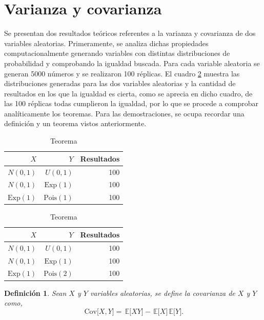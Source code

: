 \documentclass[12pt,letterpaper]{article}
\newcommand\cov[1]{\, \mathrm{Cov} \lbrack #1 \rbrack}
\newcommand\esp[1]{\, \mathbb{E} \lbrack #1 \rbrack}
\newtheorem{defi}{Definición}
\begin{document}
\section{Varianza y covarianza}
Se presentan dos resultados teóricos referentes a la varianza y covarianza de dos variables aleatorias. Primeramente, se analiza dichas propiedades computacionalmente generando variables con distintas distribuciones de probabilidad y comprobando la igualdad buscada. Para cada variable aleatoria se generan 5000 números y se realizaron 100 réplicas. El cuadro \ref{teos} muestra las distribuciones generadas para las dos variables aleatorias y la cantidad de resultados en los que la igualdad es cierta, como se aprecia en dicho cuadro, de las 100 réplicas todas cumplieron la igualdad, por lo que se procede a comprobar analíticamente los teoremas. Para las demostraciones, se ocupa recordar una definición y un teorema \cite{snell} vistos anteriormente.
\begin{table}
\caption{Resultados de las pruebas computacionales.}
\begin{subtable}{0.3\textwidth}
	\centering
	\caption{Teorema 2}
	\begin{tabular}{rrr}
  \hline
$X$ &  $Y$ & Resultados\\ 
  \hline
$N(0,1)$ & $U(0,1)$ & 100 \\
$N(0,1)$ & $\text{Exp}(1)$ & 100 \\
$\text{Exp}(1)$ & $\text{Pois}(1)$ & 100 \\ 
\hline
\end{tabular}
	\label{teo1}
\end{subtable}
\hfill
\begin{subtable}{0.3\textwidth}
	\centering
	\caption{Teorema }
	\begin{tabular}{rrr}
  \hline
$X$ &  $Y$ & Resultados\\ 
  \hline
$N(0,1)$ & $U(0,1)$ & 100 \\
$N(0,1)$ & $\text{Exp}(1)$ & 100 \\
$\text{Exp}(1)$ & $\text{Pois}(2)$ & 100 \\ 
\hline
\end{tabular}
	\label{teo2}
\end{subtable}
\label{teos}
\end{table}


\begin{defi}
Sean $X$ y $Y$ variables aleatorias, se define la covarianza de $X$ y $Y$ como, 
\begin{equation}
\cov{X, Y} = \esp{XY} - \esp{X}\esp{Y}.
\end{equation}
\end{defi}
\end{document}
